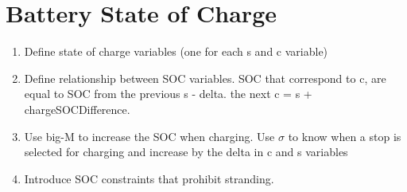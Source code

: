 \section{Battery State of Charge}
\begin{enumerate}
	\item Define state of charge variables (one for each s and c variable)
	\item Define relationship between SOC variables.  SOC that correspond to c, are equal to SOC from the previous s - delta.  the next c = s + chargeSOCDifference.
	\item Use big-M to increase the SOC when charging. Use $\sigma$ to know when a stop is selected for charging and increase by the delta in c and s variables
	\item Introduce SOC constraints that prohibit stranding.
\end{enumerate}
